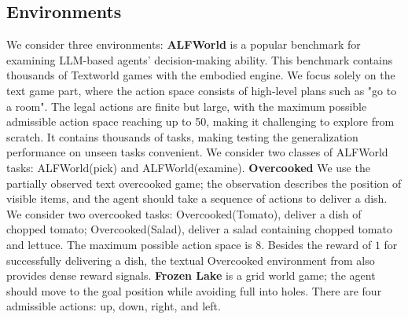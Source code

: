 \documentclass{article} %
\theoremstyle{plain}
\theoremstyle{definition}
\theoremstyle{remark}
\begin{document}
{\subsection{Environments}
We consider three environments:
\newline\textbf{ALFWorld} %
 \citep{shridhar2020alfworld} is a popular benchmark for examining LLM-based agents' decision-making ability. This benchmark contains thousands of Textworld \citep{cote2019textworld} games with the embodied engine. We focus solely on the text game part, where the action space consists of high-level plans such as "go to a room". The legal actions are finite but large, with the maximum possible admissible action space reaching up to 50, making it challenging to explore from scratch. It contains thousands of tasks, making testing the generalization performance on unseen tasks convenient. We consider two classes of ALFWorld tasks: ALFWorld(pick) and ALFWorld(examine).
\newline\textbf{Overcooked} We use the partially observed text overcooked game\citep{tantrue}; the observation describes the position of visible items, and the agent should take a sequence of actions to deliver a dish. We consider two overcooked tasks: Overcooked(Tomato), deliver a dish of chopped tomato; Overcooked(Salad), deliver a salad containing chopped tomato and lettuce. The maximum possible action space is $8$. Besides the reward of $1$ for successfully delivering a dish, the textual Overcooked environment from \citep{tantrue} also provides dense reward signals.
\newline\textbf{Frozen Lake} is a grid world game; the agent should move to the goal position while avoiding full into holes. There are four admissible actions: up, down, right, and left.
\begin{table}[]
    \caption{Results of offline algorithms. We consider two tasks, ALFWorld (Pick) and Overcooked (Salad), referred to as Pick and Salad for simplicity. To further compare the sample efficiency of the baselines, we use offline datasets of varying sizes for Overcooked (Salad), denoted as Salad ($N$), each containing approximately $N$ $(s, a, s^\prime)$ tuples.}


\end{table}}
\end{document}
